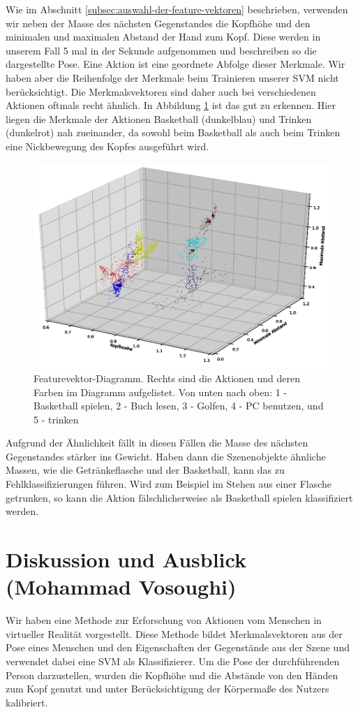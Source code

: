 Wie im Abschnitt \ref{subsec:auswahl-der-feature-vektoren} beschrieben, verwenden wir neben der Masse des nächsten Gegenstandes die Kopfhöhe und den minimalen und maximalen Abstand der Hand zum Kopf. Diese werden in unserem Fall 5 mal in der Sekunde aufgenommen und beschreiben so die dargestellte Pose. Eine Aktion ist eine geordnete Abfolge dieser Merkmale. Wir haben aber die Reihenfolge der Merkmale beim Trainieren unserer SVM nicht berücksichtigt. Die Merkmalsvektoren sind daher auch bei verschiedenen Aktionen oftmals recht ähnlich. In Abbildung \ref{fig:Merkmalvektoren-Diagramm} ist das gut zu erkennen. Hier liegen die Merkmale der Aktionen Basketball (dunkelblau) und Trinken (dunkelrot) nah zueinander, da sowohl beim Basketball als auch beim Trinken eine Nickbewegung des Kopfes ausgeführt wird.\newline
\begin{figure}[hbtp]
\includegraphics[width=1.0\linewidth]{moplot.png}
\caption{Featurevektor-Diagramm. Rechts sind die Aktionen und deren Farben im Diagramm aufgelistet. Von unten nach oben: 1 - Basketball spielen, 2 - Buch lesen, 3 - Golfen, 4 - PC benutzen, und 5 - trinken }
\label{fig:Merkmalvektoren-Diagramm}
\end{figure}
Aufgrund der Ähnlichkeit fällt in diesen Fällen die Masse des nächsten Gegenstandes stärker ins Gewicht. Haben dann die Szenenobjekte ähnliche Massen, wie die Getränkeflasche und der Basketball, kann das zu Fehlklassifizierungen führen. Wird zum Beispiel im Stehen aus einer Flasche getrunken, so kann die Aktion fälschlicherweise als \glqq{}Basketball spielen\grqq{} klassifiziert werden. 

\section{Diskussion und Ausblick \tiny{(Mohammad Vosoughi)}}
\label{diskussion-ausblick}
Wir haben eine Methode zur Erforschung von Aktionen vom Menschen in virtueller Realität vorgestellt. Diese Methode bildet Merkmalsvektoren aus der Pose eines Menschen und den Eigenschaften der Gegenstände aus der Szene und verwendet dabei eine SVM als Klassifizierer. Um die Pose der durchführenden Person darzustellen, wurden die Kopfhöhe und die Abstände von den Händen zum Kopf genutzt und unter Berücksichtigung der Körpermaße des Nutzers kalibriert. 


